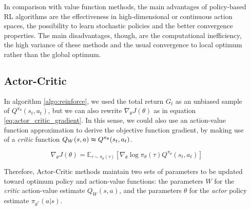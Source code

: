 In comparison with value function methods, the main advantages of policy-based RL algorithms are the effectiveness in high-dimensional or continuous action spaces, the possibility to learn stochastic policies and the better convergence properties. The main disadvantages, though, are the computational inefficiency, the high variance of these methods and the usual convergence to local optimum rather than the global optimum.


\subsection{Actor-Critic}

In algorithm \ref{algo:reinforce}, we used the total return $G_t$ as an unbiased sample of $Q^{\pi_{\theta}}(s_t,a_t)$, but we can also rewrite $\nabla_{\theta} J(\theta)$ as in equation \ref{eq:actor_critic_gradient}. In this sense, we could also use an action-value function approximation to derive the objective function gradient, by making use of a \textit{critic} function $Q_W(s,a) \thickapprox Q^{\pi_{\theta}}(s_t,a_t)$.

\begin{equation}
\nabla_{\theta} J(\theta) = \mathbb{E}_{\tau \sim \pi_{\theta}(\tau)} \left[ \nabla_{\theta} \log{\pi_{\theta}(\tau)} Q^{\pi_{\theta}}(s_t,a_t) \right]
\label{eq:actor_critic_gradient}
\end{equation}

Therefore, Actor-Critic methods maintain two sets of parameters to be updated toward optimum policy and action-value functions: the parameters $W$ for the \textit{critic} action-value estimate $Q_W(s,a)$, and the parameters $\theta$ for the \textit{actor} policy estimate $\pi_{\theta^*}(a|s)$.

